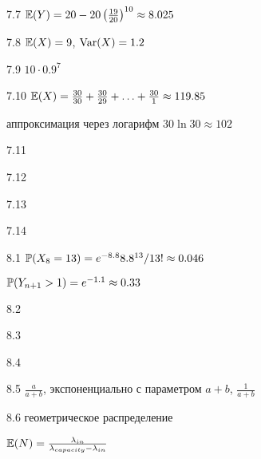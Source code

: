 \protect \hypertarget {soln:7.7}{}
\begin{solution}{{7.7}}
$\E(Y)=20-20 \left( \frac{19}{20} \right)^{10}\approx 8.025$
\end{solution}
\protect \hypertarget {soln:7.8}{}
\begin{solution}{{7.8}}
$\E(X)=9$, $\Var(X)=1.2$
\end{solution}
\protect \hypertarget {soln:7.9}{}
\begin{solution}{{7.9}}
  $10 \cdot 0.9^7$
\end{solution}
\protect \hypertarget {soln:7.10}{}
\begin{solution}{{7.10}}
  $\E(X)=\frac{30}{30} + \frac{30}{29} + \ldots + \frac{30}{1}\approx 119.85$

  аппроксимация через логарифм $30 \ln 30 \approx 102$
\end{solution}
\protect \hypertarget {soln:7.11}{}
\begin{solution}{{7.11}}
\end{solution}
\protect \hypertarget {soln:7.12}{}
\begin{solution}{{7.12}}
\end{solution}
\protect \hypertarget {soln:7.13}{}
\begin{solution}{{7.13}}
\end{solution}
\protect \hypertarget {soln:7.14}{}
\begin{solution}{{7.14}}
\end{solution}
\protect \hypertarget {soln:8.1}{}
\begin{solution}{{8.1}}
  $\P(X_8=13)=e^{-8.8}8.8^{13}/13!\approx 0.046$

  $\P(Y_{n+1}>1)=e^{-1.1}\approx 0.33$
\end{solution}
\protect \hypertarget {soln:8.2}{}
\begin{solution}{{8.2}}
\end{solution}
\protect \hypertarget {soln:8.3}{}
\begin{solution}{{8.3}}
\end{solution}
\protect \hypertarget {soln:8.4}{}
\begin{solution}{{8.4}}
\end{solution}
\protect \hypertarget {soln:8.5}{}
\begin{solution}{{8.5}}
$\frac{a}{a+b}$, экспоненциально с параметром $a+b$, $\frac{1}{a+b}$
\end{solution}
\protect \hypertarget {soln:8.6}{}
\begin{solution}{{8.6}}
  геометрическое распределение

  $\E(N)=\frac{\lambda_{in}}{\lambda_{capacity}-\lambda_{in}}$
\end{solution}
